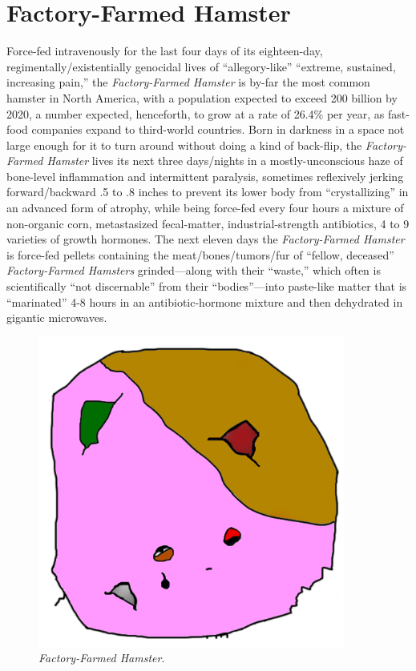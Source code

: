 \documentclass[10pt,twoside,openright]{memoir}
\begin{document}
\chapter*{Factory-Farmed Hamster}
Force-fed intravenously for the last four days of its eighteen-day,
regimentally/existentially genocidal lives of ``allegory-like'' ``extreme,
sustained, increasing pain,'' the {\em Factory-Farmed Hamster} is by-far the
most common hamster in North America, with a population expected to exceed 200
billion by 2020, a number expected, henceforth, to grow at a rate of 26.4\% per
year, as fast-food companies expand to third-world countries. Born in darkness
in a space not large enough for it to turn around without doing a kind of
back-flip, the {\em Factory-Farmed Hamster} lives its next three days/nights in
a mostly-unconscious haze of bone-level inflammation and intermittent paralysis,
sometimes reflexively jerking forward/backward .5 to .8 inches to prevent its
lower body from ``crystallizing'' in an advanced form of atrophy, while being
force-fed every four hours a mixture of non-organic corn, metastasized
fecal-matter, industrial-strength antibiotics, 4 to 9 varieties of growth
hormones. The next eleven days the {\em Factory-Farmed Hamster} is force-fed
pellets containing the meat/bones/tumors/fur of ``fellow, deceased'' {\em
Factory-Farmed Hamsters} grinded---along with their ``waste,'' which often is
scientifically ``not discernable'' from their ``bodies''---into paste-like
matter that is ``marinated'' 4-8 hours in an antibiotic-hormone mixture and then
dehydrated in gigantic microwaves. 
\begin{figure}[t!]
\begin{center}
\includegraphics[width=0.9\textwidth]{img/factoryfarmed}
\end{center}
\caption*{{\em Factory-Farmed Hamster}.}
\end{figure}
\end{document}
